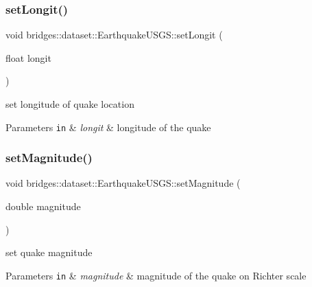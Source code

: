 \subsubsection{\texorpdfstring{set\+Longit()}{setLongit()}}
{\footnotesize\ttfamily void bridges\+::dataset\+::\+Earthquake\+U\+S\+G\+S\+::set\+Longit (\begin{DoxyParamCaption}\item[{float}]{longit }\end{DoxyParamCaption})\hspace{0.3cm}{\ttfamily [inline]}}



set longitude of quake location 


\begin{DoxyParams}[1]{Parameters}
\mbox{\tt in}  & {\em longit} & longitude of the quake \\
\hline
\end{DoxyParams}
\mbox{\label{classbridges_1_1dataset_1_1_earthquake_u_s_g_s_ab961fcafd63f3ec0626ff38e2c4c01cd}} 
\subsubsection{\texorpdfstring{set\+Magnitude()}{setMagnitude()}}
{\footnotesize\ttfamily void bridges\+::dataset\+::\+Earthquake\+U\+S\+G\+S\+::set\+Magnitude (\begin{DoxyParamCaption}\item[{double}]{magnitude }\end{DoxyParamCaption})\hspace{0.3cm}{\ttfamily [inline]}}



set quake magnitude 


\begin{DoxyParams}[1]{Parameters}
\mbox{\tt in}  & {\em magnitude} & magnitude of the quake on Richter scale \\
\hline
\end{DoxyParams}
\mbox{\label{classbridges_1_1dataset_1_1_earthquake_u_s_g_s_af191301bcbaa5278480a57e9aea674d7}} 

